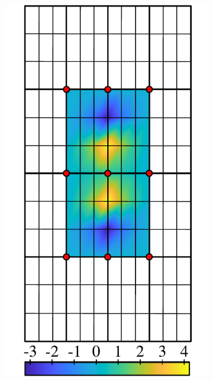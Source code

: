 \begin{figure} [htbp]
\begin{subfigure}[t]{0.22\textwidth}
  \centerline{\includegraphics[width=\linewidth]{figs/FE_12x12_c}}
  \caption{\label{fig:fem_demo_orig}}
\end{subfigure}
\hfill
\begin{subfigure}[t]{0.22\textwidth}

\end{subfigure}
\end{figure}
